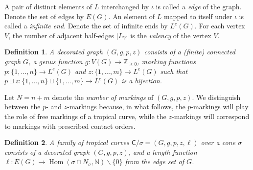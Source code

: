 \documentclass{article}
\newtheorem{definition}{Definition}[section]
\newcommand{\tropC}{\mathsf{C}}
\begin{document}
    A pair of distinct elements of $L$ interchanged by $\iota$ is called a \emph{edge} of the graph. Denote the set of edges by $E(G)$. An element of $L$ mapped to itself under $\iota$ is called a \emph{infinite end}. Denote the set of infinite ends by $L^e(G)$. 
    For each vertex $V$, the number of adjacent half-edges $|L_V|$ is the \emph{valency} of the vertex $V$.

    \begin{definition}
        A decorated graph $(G, g, p, z)$ consists of a (finite) connected graph $G$, a genus function $g: V(G) \rightarrow \mathbb{Z}_{\geq 0}$, marking functions $p: \{1, \ldots, n\} \rightarrow L^e(G)$ and $z: \{1, \ldots, m\} \rightarrow L^e(G)$ such that $p \sqcup z: \{1, \ldots, n\} \sqcup \{1,\ldots, m\} \rightarrow L^e(G)$ is a bijection. 
    \end{definition}

    Let $N = n + m$ denote the \emph{number of markings} of $(G, g, p, z)$. We distinguish between the $p$- and $z$-markings because, in what follows, the $p$-markings will play the role of free markings of a tropical curve, while the $z$-markings will correspond to markings with prescribed contact orders.
    
    \begin{definition}
        \cite[Definition 2.19]{ACGSI}
		A family of tropical curves $\tropC/\sigma = (G, g, p, z, \ell)$ over a cone $\sigma$ consists of a decorated graph $(G, g, p, z)$, and a length function $\ell:E(G) \rightarrow \operatorname{Hom}(\sigma \cap N_{\sigma}, \mathbb{N}) \smallsetminus \{0\}$ from the edge set of $G$. 
	\end{definition}

    
    
\end{document}

